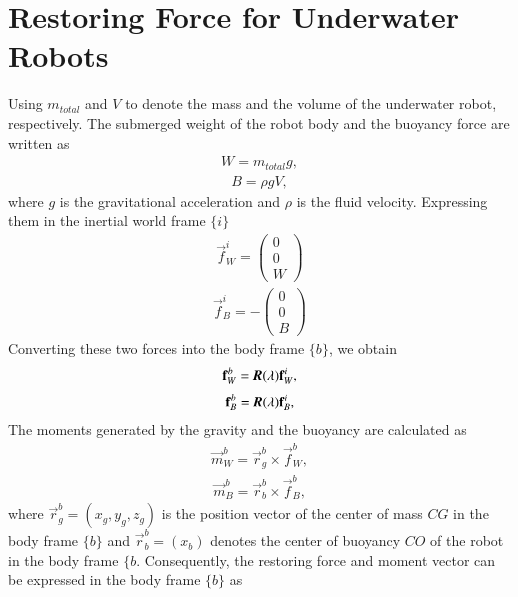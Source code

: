 \section{Restoring Force for Underwater Robots}
Using $m_{total}$ and $V$ to denote the mass and the volume of the underwater robot, respectively. The submerged weight of the robot body and the buoyancy force are written as
\begin{align}
W=m_{total}g,
\end{align}
\begin{align}
B=\rho g V,
\end{align}
where $g$ is the gravitational acceleration and $\rho$ is the fluid velocity. 
Expressing them in the inertial world frame $\lbrace i \rbrace$
\begin{align}
\vec{f}_{W}^{i}=\begin{pmatrix}
0\\0\\W
\end{pmatrix}
\end{align}
\begin{align}
\vec{f}_{B}^{i}=-\begin{pmatrix}
0\\0\\B
\end{pmatrix}
\end{align}
Converting these two forces into the body frame $\lbrace b \rbrace$, we obtain
\begin{align}
\vec{f}_{W}^{b}=\emph{\textbf{R}}(\vec{\lambda})\vec{f}_{W}^{i},
\end{align}
\begin{align}
\vec{f}_{B}^{b}=\emph{\textbf{R}}(\vec{\lambda})\vec{f}_{B}^{i},
\end{align}
The moments generated by the gravity and the buoyancy are calculated as
\begin{align}
\vec{m}_{W}^{b}=\vec{r}_{g}^{b}\times \vec{f}_{W}^{b},
\end{align}
\begin{align}
\vec{m}_{B}^{b}=\vec{r}_{b}^{b}\times \vec{f}_{B}^{b},
\end{align}
where $\vec{r}_{g}^{b}=(x_{g},y_{g},z_{g})$ is the position vector of the center of mass $CG$ in the body frame $\lbrace b \rbrace$ and $\vec{r}_{b}^{b}=(x_{b})$ denotes the center of buoyancy $CO$ of the robot in the body frame $\lbrace b$.
Consequently, the restoring force and moment vector can be expressed in the body frame $\lbrace b \rbrace$ as
